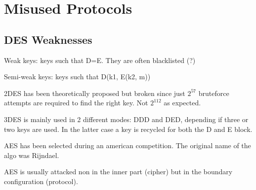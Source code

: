 \chapter{Misused Protocols}
\section{DES Weaknesses}
Weak keys: keys such that D=E. They are often blacklisted (?)

Semi-weak keys: keys such that D(k1, E(k2, m))

2DES has been theoretically proposed but broken since just $2^{57}$ bruteforce attempts are required to find the right key.
Not $2^{112}$ as expected.

3DES is mainly used in 2 different modes: DDD and DED, depending if three or two keys are used.
In the latter case a key is recycled for both the D and E block.

AES has been selected during an american competition. The original name of the algo was Rijndael.

AES is usually attacked non in the inner part (cipher) but in the boundary configuration (protocol).